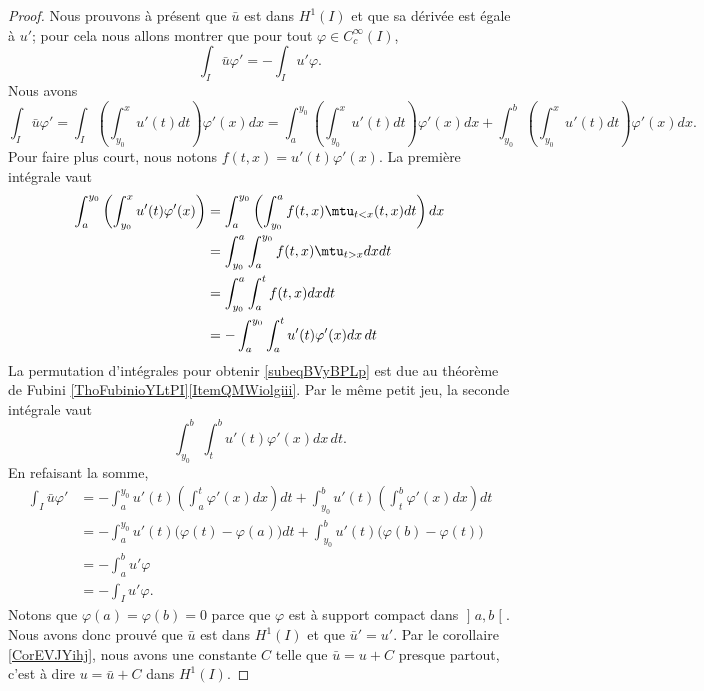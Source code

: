 \begin{proof}
    Nous prouvons à présent que \( \bar u\) est dans \( H^1(I)\) et que sa dérivée est égale à \( u'\); pour cela nous allons montrer que pour tout \( \varphi\in  C^{\infty}_c(I)\),
    \begin{equation}
        \int_I\bar u\varphi'=-\int_Iu'\varphi.
    \end{equation}
    Nous avons
    \begin{equation}
            \int_I\bar u\varphi'=\int_I\left( \int_{y_0}^xu'(t)dt\right)\varphi'(x)dx
            =\int_{a}^{y_0}\left( \int_{y_0}^xu'(t)dt\right)\varphi'(x)dx+\int_{y_0}^b\left( \int_{y_0}^xu'(t)dt\right)\varphi'(x)dx.
    \end{equation}
    Pour faire plus court, nous notons \( f(t,x)=u'(t)\varphi'(x)\). La première intégrale vaut
    \begin{subequations}
        \begin{align}
            \int_a^{y_0}\left( \int_{y_0}^x u'(t)\varphi'(x) \right)&=\int_a^{y_0}\left(\int_{y_0}^af(t,x)\mtu_{t<x}(t,x)dt\right)dx\\
            &=\int_{y_0}^a\int_a^{y_0}f(t,x)\mtu_{t>x}dxdt  \label{subeqBVyBPLp}\\
            &=\int_{y_0}^a\int_a^tf(t,x)dxdt\\
            &=-\int_a^{y_0}\int_a^tu'(t)\varphi'(x)dx\,dt
        \end{align}
    \end{subequations}
    La permutation d'intégrales pour obtenir \eqref{subeqBVyBPLp} est due au théorème de Fubini \ref{ThoFubinioYLtPI}\ref{ItemQMWiolgiii}. Par le même petit jeu, la seconde intégrale vaut
    \begin{equation}
        \int_{y_0}^b\int_t^b u'(t)\varphi'(x)dx\,dt.
    \end{equation}
    En refaisant la somme,
    \begin{subequations}
        \begin{align}
            \int_I\bar u\varphi'
            &=-\int_a^{y_0}u'(t)\left( \int_a^t\varphi'(x)dx \right)dt+\int_{y_0}^bu'(t)\left( \int_t^b\varphi'(x)dx \right)dt\\
            &=-\int_a^{y_0}u'(t)\big( \varphi(t)-\varphi(a) \big)dt+\int_{y_0}^bu'(t)\big( \varphi(b)-\varphi(t) \big)\\
            &=-\int_a^bu'\varphi\\
            &=-\int_Iu'\varphi.
        \end{align}
    \end{subequations}
    Notons que \( \varphi(a)=\varphi(b)=0\) parce que \( \varphi\) est à support compact dans \( \mathopen] a , b \mathclose[\). Nous avons donc prouvé que \( \bar u\) est dans \( H^1(I)\) et que \( \bar u'=u'\). Par le corollaire \ref{CorEVJYihj}, nous avons une constante \( C\) telle que \( \bar u=u+C\) presque partout, c'est à dire \( u=\bar u +C\) dans \( H^1(I)\). 


\end{proof}
